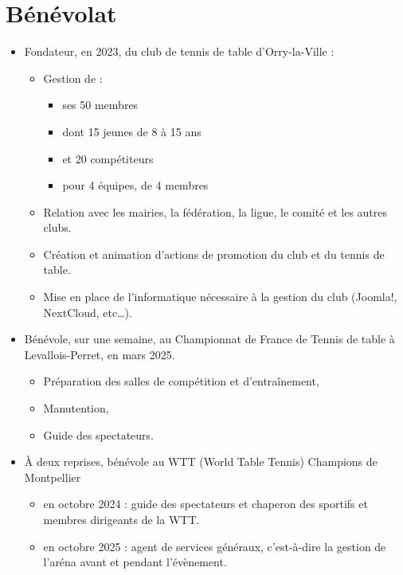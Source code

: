 \section{Bénévolat}

\begin{itemize}
    \item{Fondateur, en 2023, du club de tennis de table d’Orry-la-Ville  :}
        \begin{itemize}
            \item{Gestion de :}
                \begin{itemize}
                    \item{ses 50 membres}
                    \item{dont 15 jeunes de 8 à 15 ans}
                    \item{et 20 compétiteurs}
                    \item{pour 4 équipes, de 4 membres}
                \end{itemize}
            \item{Relation avec les mairies, la fédération, la ligue, le comité et les autres clubs.}
            \item{Création et animation d’actions de promotion du club et du tennis de table.}
            \item{Mise en place de l’informatique nécessaire à la gestion du club (Joomla!, NextCloud, etc\dots).}
        \end{itemize}
    \item{Bénévole, sur une semaine, au Championnat de France de Tennis de table à Levallois-Perret, en mars 2025.}
        \begin{itemize}
            \item{Préparation des salles de compétition et d'entraînement,}
            \item{Manutention,}
            \item{Guide des spectateurs.}
        \end{itemize}
    \item{À deux reprises, bénévole au WTT (World Table Tennis) Champions de Montpellier}
        \begin{itemize}
            \item{en octobre 2024 : guide des spectateurs et chaperon des sportifs et membres dirigeants de la WTT.}
            \item{en octobre 2025 : agent de services généraux, c'est-à-dire la gestion de l'aréna avant et pendant l'évènement.}

\end{itemize}
\end{itemize}
